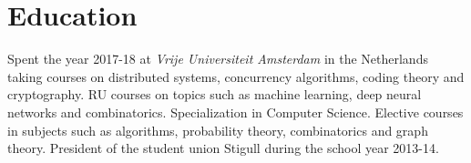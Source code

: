 \documentclass[11pt,a4paper,sans]{moderncv}
\begin{document}
\section{Education}
{}
{Spent the year 2017-18 at \emph{Vrije Universiteit Amsterdam} in the Netherlands taking
courses on distributed systems, concurrency algorithms, coding  theory and cryptography.
RU courses on topics such as machine learning, deep neural networks and combinatorics.
}
{}
{Specialization in Computer Science. Elective courses in subjects such as
algorithms, probability theory, combinatorics and graph theory.
President of the student union Stigull during the school year 2013-14.
}

\end{document}
